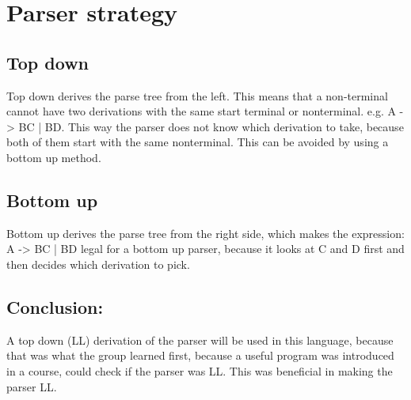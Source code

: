 \section{Parser strategy}
\subsection*{Top down}
Top down derives the parse tree from the left. This means that a non-terminal cannot have two derivations with the same start terminal or nonterminal. e.g. A -> BC | BD. This way the parser does not know which derivation to take, because both of them start with the same nonterminal.
This can be avoided by using a bottom up method.


\subsection*{Bottom up}
Bottom up derives the parse tree from the right side, which makes the expression: A -> BC | BD legal for a bottom up parser, because it looks at C and D first and then decides which derivation to pick.


\subsection*{Conclusion:}
A top down (LL) derivation of the parser will be used in this language, because that was what the group learned first, because a useful program was introduced in a course, could check if the parser was LL. This was beneficial in making the parser LL.
